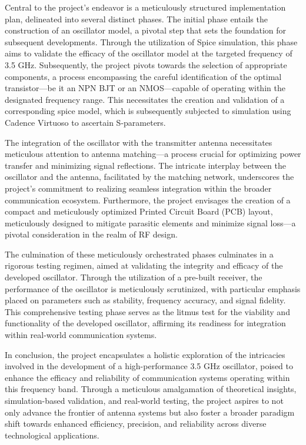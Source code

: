 Central to the project's endeavor is a meticulously structured implementation plan, delineated into several distinct phases. The initial phase entails the construction of an oscillator model, a pivotal step that sets the foundation for subsequent developments. Through the utilization of Spice simulation, this phase aims to validate the efficacy of the oscillator model at the targeted frequency of 3.5 GHz. Subsequently, the project pivots towards the selection of appropriate components, a process encompassing the careful identification of the optimal transistor—be it an NPN BJT or an NMOS—capable of operating within the designated frequency range. This necessitates the creation and validation of a corresponding spice model, which is subsequently subjected to simulation using Cadence Virtuoso to ascertain S-parameters.\par

The integration of the oscillator with the transmitter antenna necessitates meticulous attention to antenna matching—a process crucial for optimizing power transfer and minimizing signal reflections. The intricate interplay between the oscillator and the antenna, facilitated by the matching network, underscores the project's commitment to realizing seamless integration within the broader communication ecosystem. Furthermore, the project envisages the creation of a compact and meticulously optimized Printed Circuit Board (PCB) layout, meticulously designed to mitigate parasitic elements and minimize signal loss—a pivotal consideration in the realm of RF design.\par

The culmination of these meticulously orchestrated phases culminates in a rigorous testing regimen, aimed at validating the integrity and efficacy of the developed oscillator. Through the utilization of a pre-built receiver, the performance of the oscillator is meticulously scrutinized, with particular emphasis placed on parameters such as stability, frequency accuracy, and signal fidelity. This comprehensive testing phase serves as the litmus test for the viability and functionality of the developed oscillator, affirming its readiness for integration within real-world communication systems.\par

In conclusion, the project encapsulates a holistic exploration of the intricacies involved in the development of a high-performance 3.5 GHz oscillator, poised to enhance the efficacy and reliability of communication systems operating within this frequency band. Through a meticulous amalgamation of theoretical insights, simulation-based validation, and real-world testing, the project aspires to not only advance the frontier of antenna systems but also foster a broader paradigm shift towards enhanced efficiency, precision, and reliability across diverse technological applications.
